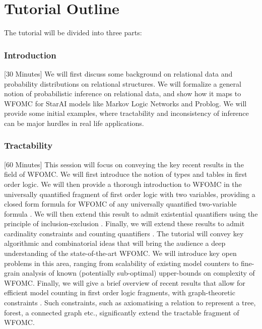 \section{Tutorial Outline}
The tutorial will be divided into three parts:

\subsubsection{Introduction} [30 Minutes] 
We will first discuss some background on relational data and probability distributions on relational structures. We will formalize a general notion of probabilistic inference on relational data, and show how it maps to WFOMC for StarAI models like Markov Logic Networks and Problog. We will provide some initial examples, where tractability and inconsistency of inference can be major hurdles in real life applications.


\subsubsection{Tractability} [60 Minutes] This session will focus on conveying the key recent results in the field of WFOMC. We will first introduce the notion of types and tables in first order logic. We will then provide a thorough introduction to WFOMC in the universally quantified fragment of first order logic with two variables, providing a closed form formula for WFOMC of any universally quantified two-variable formula \cite{Symmetric_Weighted}. We will then extend this result to admit existential quantifiers using the principle of inclusion-exclusion \cite{broeck2013,MalhotraS22}. Finally, we will extend these results to admit cardinality constraints and counting quantifiers \cite{kuzelka2020weighted}. The tutorial  will convey key algorithmic and combinatorial ideas \cite{MalhotraS22} that will bring the audience a deep understanding of the state-of-the-art  WFOMC. We will introduce key open problems in this area, ranging from scalability of existing model counters \cite{pmlr-v161-bremen21a} to fine-grain analysis of known (potentially sub-optimal) upper-bounds on complexity of WFOMC. Finally, we will give a brief overview of recent results that allow for efficient model counting in first order logic fragments, with graph-theoretic constraints \cite{LI_Tree,Malhotra2023LiftedIB}. Such constraints, such as axiomatising a relation to represent a tree, forest, a connected graph etc., significantly extend the tractable fragment of WFOMC.

